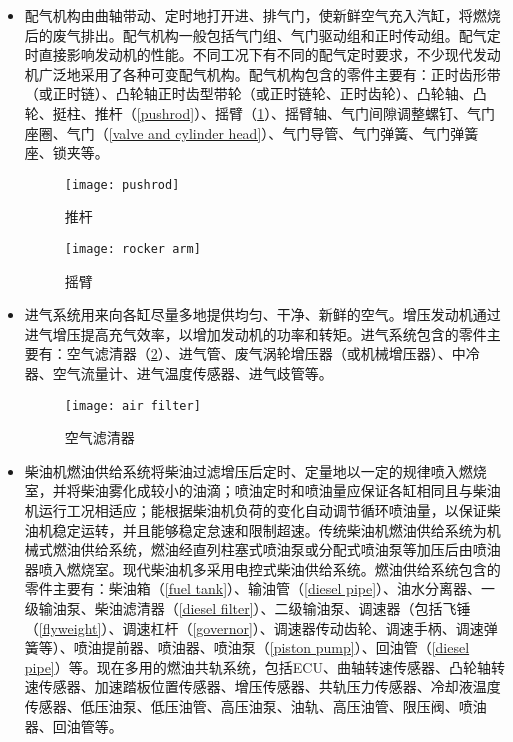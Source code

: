 \documentclass[UTF8]{ctexart}
\numberwithin{figure}{section}
\numberwithin{table}{section}
\begin{document}
\begin{itemize}
	\item 配气机构由曲轴带动、定时地打开进、排气门，使新鲜空气充入汽缸，将燃烧后的废气排出。配气机构一般包括气门组、气门驱动组和正时传动组。配气定时直接影响发动机的性能。不同工况下有不同的配气定时要求，不少现代发动机广泛地采用了各种可变配气机构。配气机构包含的零件主要有：正时齿形带（或正时链）、凸轮轴正时齿型带轮（或正时链轮、正时齿轮）、凸轮轴、凸轮、挺柱、推杆（\cref{pushrod}）、摇臂（\cref{rocker arm}）、摇臂轴、气门间隙调整螺钉、气门座圈、气门（\cref{valve and cylinder head}）、气门导管、气门弹簧、气门弹簧座、锁夹等。

	      \begin{figure}[htbp]
		      \centering
		      \begin{minipage}[b]{0.7\textwidth}
			      \centering
			      \texttt{[image: pushrod]}
			      \caption{推杆}
			      \label{pushrod}
		      \end{minipage}
		      \begin{minipage}[b]{0.2\textwidth}
			      \centering
			      \texttt{[image: rocker arm]}
			      \caption{摇臂}
			      \label{rocker arm}
		      \end{minipage}
	      \end{figure}

	\item 进气系统用来向各缸尽量多地提供均匀、干净、新鲜的空气。增压发动机通过进气增压提高充气效率，以增加发动机的功率和转矩。进气系统包含的零件主要有：空气滤清器（\cref{air filter}）、进气管、废气涡轮增压器（或机械增压器）、中冷器、空气流量计、进气温度传感器、进气歧管等。

	      \begin{figure}[htbp]
		      \centering
		      \begin{minipage}[b]{0.4\textwidth}
			      \centering
			      \texttt{[image: air filter]}
			      \caption{空气滤清器}
			      \label{air filter}
		      \end{minipage}
	      \end{figure}

	\item 柴油机燃油供给系统将柴油过滤增压后定时、定量地以一定的规律喷入燃烧室，并将柴油雾化成较小的油滴；喷油定时和喷油量应保证各缸相同且与柴油机运行工况相适应；能根据柴油机负荷的变化自动调节循环喷油量，以保证柴油机稳定运转，并且能够稳定怠速和限制超速。传统柴油机燃油供给系统为机械式燃油供给系统，燃油经直列柱塞式喷油泵或分配式喷油泵等加压后由喷油器喷入燃烧室。现代柴油机多采用电控式柴油供给系统。燃油供给系统包含的零件主要有：柴油箱（\cref{fuel tank}）、输油管（\cref{diesel pipe}）、油水分离器、一级输油泵、柴油滤清器（\cref{diesel filter}）、二级输油泵、调速器（包括飞锤（\cref{flyweight}）、调速杠杆（\cref{governor}）、调速器传动齿轮、调速手柄、调速弹簧等）、喷油提前器、喷油器、喷油泵（\cref{piston pump}）、回油管（\cref{diesel pipe}）等。现在多用的燃油共轨系统，包括ECU、曲轴转速传感器、凸轮轴转速传感器、加速踏板位置传感器、增压传感器、共轨压力传感器、冷却液温度传感器、低压油泵、低压油管、高压油泵、油轨、高压油管、限压阀、喷油器、回油管等。


\end{itemize}
\end{document}
